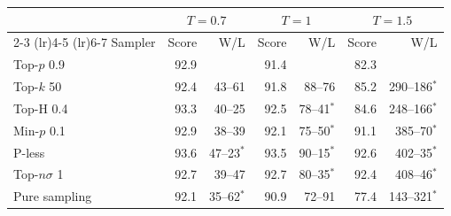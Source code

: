 \begin{tabular}{lrrrrrr}
\toprule
& \multicolumn{2}{c}{$T{=}0.7$} & \multicolumn{2}{c}{$T{=}1$} & \multicolumn{2}{c}{$T{=}1.5$} \\
\cmidrule(lr){2-3} \cmidrule(lr){4-5} \cmidrule(lr){6-7}
Sampler & Score & W/L & Score & W/L & Score & W/L \\
\midrule
Top-$p$ 0.9 & 92.9 &  & 91.4 &  & 82.3 &  \\
Top-$k$ 50 & 92.4 & 43--61 & 91.8 & 88--76 & 85.2 & 290--186$^{*}$ \\
Top-H 0.4 & 93.3 & 40--25 & 92.5 & 78--41$^{*}$ & 84.6 & 248--166$^{*}$ \\
Min-$p$ 0.1 & 92.9 & 38--39 & 92.1 & 75--50$^{*}$ & 91.1 & 385--70$^{*}$ \\
P-less & 93.6 & 47--23$^{*}$ & 93.5 & 90--15$^{*}$ & 92.6 & 402--35$^{*}$ \\
Top-$n\sigma$ 1 & 92.7 & 39--47 & 92.7 & 80--35$^{*}$ & 92.4 & 408--46$^{*}$ \\
Pure sampling & 92.1 & 35--62$^{*}$ & 90.9 & 72--91 & 77.4 & 143--321$^{*}$ \\
\bottomrule
\end{tabular}